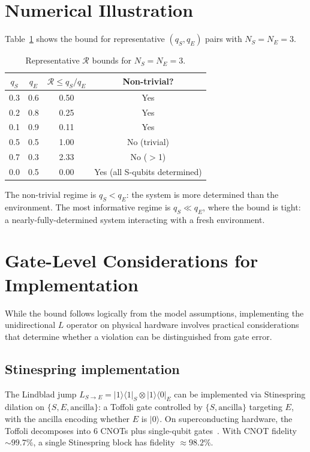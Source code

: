 \documentclass[aps,prl,onecolumn]{revtex4-2}
\begin{document}
\section{Numerical Illustration}

Table~\ref{tab:examples} shows the bound for representative $(q_S, q_E)$ pairs with $N_S = N_E = 3$.

\begin{table}[h]
\centering
\caption{Representative $\mathcal{R}$ bounds for $N_S = N_E = 3$.}
\label{tab:examples}
\begin{tabular}{cccc}
\toprule
$q_S$ & $q_E$ & $\mathcal{R} \leq q_S/q_E$ & Non-trivial? \\
\midrule
0.3 & 0.6 & 0.50 & Yes \\
0.2 & 0.8 & 0.25 & Yes \\
0.1 & 0.9 & 0.11 & Yes \\
0.5 & 0.5 & 1.00 & No (trivial) \\
0.7 & 0.3 & 2.33 & No ($>$1) \\
0.0 & 0.5 & 0.00 & Yes (all S-qubits determined) \\
\bottomrule
\end{tabular}
\end{table}

The non-trivial regime is $q_S < q_E$: the system is more determined than the environment. The most informative regime is $q_S \ll q_E$, where the bound is tight: a nearly-fully-determined system interacting with a fresh environment.

\section{Gate-Level Considerations for Implementation}

While the bound follows logically from the model assumptions, implementing the unidirectional $L$ operator on physical hardware involves practical considerations that determine whether a violation can be distinguished from gate error.

\subsection{Stinespring implementation}

The Lindblad jump $L_{S\to E} = |1\rangle\langle 1|_S \otimes |1\rangle\langle 0|_E$ can be implemented via Stinespring dilation on $\{S, E, \text{ancilla}\}$: a Toffoli gate controlled by $\{S, \text{ancilla}\}$ targeting $E$, with the ancilla encoding whether $E$ is $|0\rangle$. On superconducting hardware, the Toffoli decomposes into 6 CNOTs plus single-qubit gates~\cite{Shende:2009}. With CNOT fidelity $\sim 99.7\%$, a single Stinespring block has fidelity $\approx 98.2\%$.
\end{document}
